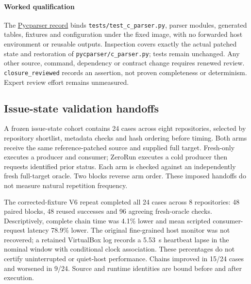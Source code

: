 \documentclass[preprint,12pt,a4paper]{elsarticle}
\newcommand{\code}[1]{\texttt{#1}}
\begin{document}
\paragraph{Worked qualification} The \href{https://github.com/floxy-21/zerorun-research/blob/6a2aab778a290102dbe4c8652eefb3310d15d1e0/research/softwarex/evidence/agent-application-053-consumers-v2/record-only/cases/eliben__pycparser-236/plan/qualification.json}{Pycparser record} binds \code{tests/test\_c\_parser.py}, parser modules, generated tables, fixtures and configuration under the fixed image, with no forwarded host environment or reusable outputs. Inspection covers exactly the actual patched state and restoration of \code{pycparser/c\_parser.py}; tests remain unchanged. Any other source, command, dependency or contract change requires renewed review. \code{closure\_reviewed} records an assertion, not proven completeness or determinism. Expert review effort remains unmeasured.

\subsection{Issue-state validation handoffs}
\begingroup\setlength{\tabcolsep}{2.8pt}
A frozen issue-state cohort contains 24 cases across eight repositories, selected by repository shortlist, metadata checks and hash ordering before timing. Both arms receive the same reference-patched source and supplied full target. Fresh-only executes a producer and consumer; ZeroRun executes a cold producer then requests identified prior status. Each arm is checked against an independently fresh full-target oracle. Two blocks reverse arm order. These imposed handoffs do not measure natural repetition frequency.

The corrected-fixture V6 repeat completed all 24 cases across 8 repositories: 48 paired blocks, 48 reused successes and 96 agreeing fresh-oracle checks. Descriptively, complete chain time was 4.1\% lower and mean scripted consumer-request latency 78.9\% lower. The original fine-grained host monitor was not recovered; a retained VirtualBox log records a 5.53~s heartbeat lapse in the nominal window with conditional clock association. These percentages do not certify uninterrupted or quiet-host performance. Chains improved in 15/24 cases and worsened in 9/24. Source and runtime identities are bound before and after execution.
\end{document}
